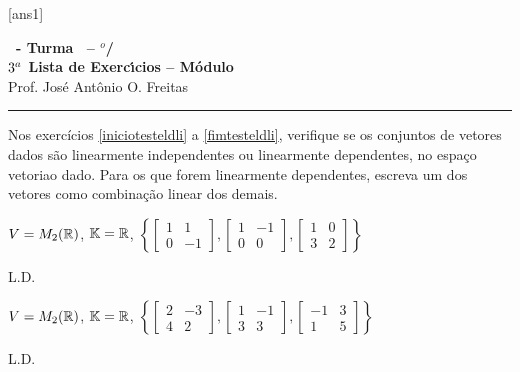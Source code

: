 \documentclass[12pt]{exam}
\begin{document}
    [ans1]
    
    \begin{center}
        {\Large\bf \disciplina\ - Turma \turma\ -- \semestre$^{o}$/\ano} \\ \vspace{9pt} {\large\bf
            $3^a$ Lista de Exerc{\'\i}cios -- Módulo \numeromodulo}\\ \vspace{9pt} Prof. Jos{\'e} Ant{\^o}nio O. Freitas
    \end{center}
    
    \hrule

    Nos exercícios \ref{iniciotesteldli} a \ref{fimtesteldli}, verifique se os conjuntos de vetores dados são 
    linearmente independentes ou linearmente dependentes, 
    no espaço vetoriao dado. Para os que forem linearmente dependentes,
    escreva um dos vetores como combinação linear dos demais.

    \begin{exercicio}\label{iniciotesteldli}
        $V = M_2(\mathbb{R})$, $\mathbb{K} = \mathbb{R}$,
        $
            \left\{
                \begin{bmatrix}
                    1 & 1\\
                    0 & -1
                \end{bmatrix},
                \begin{bmatrix}
                    1 & -1\\
                    0 & 0
                \end{bmatrix},
                \begin{bmatrix}
                    1 & 0\\
                    3 & 2
                \end{bmatrix}
            \right\}
        $
        \begin{solucao}
            L.D.
        \end{solucao}
    \end{exercicio}

    \begin{exercicio}
        $V = M_2(\mathbb{R})$, $\mathbb{K} = \mathbb{R}$,
        $
            \left\{
                \begin{bmatrix}
                    2 & -3\\
                    4 & 2
                \end{bmatrix},
                \begin{bmatrix}
                    1 & -1\\
                    3 & 3
                \end{bmatrix},
                \begin{bmatrix}
                    -1 & 3\\
                    1 & 5
                \end{bmatrix}
            \right\}
        $
        \begin{solucao}
            L.D.
        \end{solucao}
    \end{exercicio}
    
\end{document}
